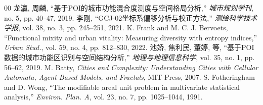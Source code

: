 \documentclass[conference]{IEEEtran}
\begin{document}
\begin{thebibliography}{00}
 龙瀛, 周麟, ``基于POI的城市功能混合度测度与空间格局分析,'' \textit{城市规划学刊}, no. 5, pp. 40--47, 2019.
 李刚, ``GCJ-02坐标系偏移分析与校正方法,'' \textit{测绘科学技术学报}, vol. 38, no. 3, pp. 245--251, 2021.
 K. Frank and M. C. J. Bervoets, ``Functional mixity and urban vitality: Measuring diversity with entropy indices,'' \textit{Urban Stud.}, vol. 59, no. 4, pp. 812--830, 2022.
 池娇, 焦利民, 董婷, 等, ``基于POI数据的城市功能区识别与空间结构分析,'' \textit{地理与地理信息科学}, vol. 35, no. 1, pp. 56--62, 2019.
 M. Batty, \textit{Cities and Complexity: Understanding Cities with Cellular Automata, Agent-Based Models, and Fractals}, MIT Press, 2007.
 S. Fotheringham and D. Wong, ``The modifiable areal unit problem in multivariate statistical analysis,'' \textit{Environ. Plan. A}, vol. 23, no. 7, pp. 1025--1044, 1991.
\end{thebibliography}
\end{document}
